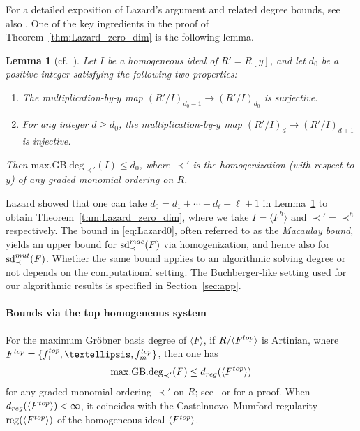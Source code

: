 \documentclass{article}
\newtheorem{lemma}[theorem]{Lemma}
\theoremstyle{definition}
\theoremstyle{plain}
\theoremstyle{plain}
\theoremstyle{plain}
\theoremstyle{plain}
\numberwithin{equation}{subsection}
\begin{document}
For a detailed exposition of Lazard's argument and related degree bounds, see also \cite{C14}.
One of the key ingredients in the proof of Theorem~\ref{thm:Lazard_zero_dim} is the following lemma.

\begin{lemma}[cf.\ \cite{Lazard}]\label{lem:Lazard}
Let $I$ be a homogeneous ideal of $R'=R[y]$, and let $d_0$ be a positive integer satisfying the following two properties:
\begin{enumerate}
    \item[(1)] The multiplication-by-$y$ map $(R'/I)_{d_0-1} \longrightarrow (R'/I)_{d_0}$ is surjective.
    \item[(2)] For any integer $d \ge d_0$, the multiplication-by-$y$ map $(R'/I)_{d} \longrightarrow (R'/I)_{d+1}$ is injective.
\end{enumerate}
Then $\mathrm{max.GB.deg}_{\prec'}(I) \le d_0$, where $\prec'$ is the homogenization (with respect to $y$) of any graded monomial ordering on $R$.
\end{lemma}

Lazard showed that one can take $d_0=d_1+\cdots+d_{\ell}-\ell+1$ in Lemma~\ref{lem:Lazard} to obtain Theorem~\ref{thm:Lazard_zero_dim}, where we take $I=\langle F^h\rangle$ and $\prec'=\prec^h$ respectively.
The bound in \eqref{eq:Lazard0}, often referred to as the \emph{Macaulay bound}, yields an upper bound for $\mathrm{sd}_{\prec}^{\rm mac}(F)$ via homogenization, and hence also for $\mathrm{sd}_{\prec}^{\rm mut}(F)$.
Whether the same bound applies to an algorithmic solving degree or not depends on the computational setting.
The Buchberger-like setting used for our algorithmic results is specified in Section~\ref{sec:app}.

\paragraph{Bounds via the top homogeneous system}
For the maximum Gr\"obner basis degree of $\langle F\rangle$, if
$R/\langle F^{\rm top}\rangle$ is Artinian, 
{where $F^{\rm top}=\{f_1^{\rm top},\ldots,f_m^{\rm top}\}$}, then one has
\begin{equation}\label{eq:crypto}
\mathrm{max.GB.deg}_{\prec'}(F) \leq d_{\rm reg}(\langle F^{\rm top} \rangle)
\end{equation}
for any graded monomial ordering $\prec'$ on $R$; see~\cite[Remark~15]{CG20} or \cite[Lemma 4]{KY} for a proof.
When $d_{\rm reg}(\langle F^{\rm top}\rangle)<\infty$, it coincides with the Castelnuovo--Mumford regularity $\mathrm{reg}(\langle F^{\rm top}\rangle)$ of the homogeneous ideal $\langle F^{\rm top}\rangle$.
\end{document}
